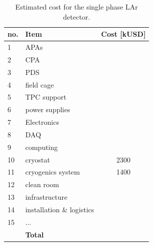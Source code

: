 \begin{table}[h!]
\centering
\begin{tabular}{| l| l| c |}
\hline
\textbf{no. } & \textbf{Item}  & \textbf{Cost [kUSD]}  \\ \hline
1 & APAs & \\
2 & CPA  & \\
3 & PDS  & \\
4 & field cage  & \\
5 & TPC support & \\
6 & power supplies & \\
7 & Electronics & \\
8 & DAQ & \\
9 & computing & \\
10 & cryostat & 2300 \\
11 & cryogenics system & 1400 \\
12 & clean room & \\
13 & infrastructure & \\
14 & installation \& logistics & \\
15 & ... & \\ \hline
  & \textbf{Total } & \\ \hline
\end{tabular}
\caption{Estimated cost for the single phase LAr detector.}
\label{tab:cost}
\end{table}












